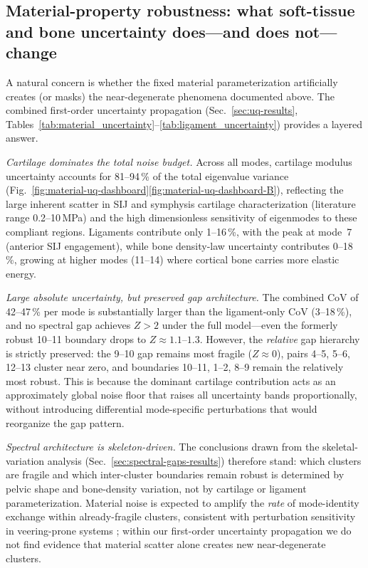 \documentclass[11pt]{article}
\begin{document}
\subsection*{Material-property robustness: what soft-tissue and bone uncertainty does---and does not---change}
A natural concern is whether the fixed material parameterization artificially creates (or masks) the near-degenerate phenomena documented above.
The combined first-order uncertainty propagation (Sec.~\ref{sec:uq-results}, Tables~\ref{tab:material_uncertainty}--\ref{tab:ligament_uncertainty}) provides a layered answer.

\emph{Cartilage dominates the total noise budget.}
Across all modes, cartilage modulus uncertainty accounts for 81--94\,\% of the total eigenvalue variance (Fig.~\ref{fig:material-uq-dashboard}\ref{fig:material-uq-dashboard-B}), reflecting the large inherent scatter in SIJ and symphysis cartilage characterization (literature range 0.2--10\,MPa) and the high dimensionless sensitivity of eigenmodes to these compliant regions.
Ligaments contribute only 1--16\,\%, with the peak at mode~7 (anterior SIJ engagement), while bone density-law uncertainty contributes 0--18\,\%, growing at higher modes (11--14) where cortical bone carries more elastic energy.

\emph{Large absolute uncertainty, but preserved gap architecture.}
The combined CoV of 42--47\,\% per mode is substantially larger than the ligament-only CoV (3--18\,\%), and no spectral gap achieves $Z > 2$ under the full model---even the formerly robust 10--11 boundary drops to $Z \approx 1.1$--$1.3$.
However, the \emph{relative} gap hierarchy is strictly preserved: the 9--10 gap remains most fragile ($Z \approx 0$), pairs 4--5, 5--6, 12--13 cluster near zero, and boundaries 10--11, 1--2, 8--9 remain the relatively most robust.
This is because the dominant cartilage contribution acts as an approximately global noise floor that raises all uncertainty bands proportionally, without introducing differential mode-specific perturbations that would reorganize the gap pattern.

\emph{Spectral architecture is skeleton-driven.}
The conclusions drawn from the skeletal-variation analysis (Sec.~\ref{sec:spectral-gaps-results}) therefore stand: which clusters are fragile and which inter-cluster boundaries remain robust is determined by pelvic shape and bone-density variation, not by cartilage or ligament parameterization.
Material noise is expected to amplify the \emph{rate} of mode-identity exchange within already-fragile clusters, consistent with perturbation sensitivity in veering-prone systems \citep{Pierre1988,Chen2019Veering}; within our first-order uncertainty propagation we do not find evidence that material scatter alone creates new near-degenerate clusters.
\end{document}

